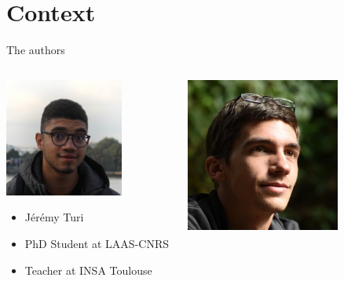 \section{Context}

\begin{frame}{The authors}
    \begin{columns}
        \begin{column}{0.5\textwidth}
            \includegraphics[width = 0.7\textwidth]{images/profile_picture/jeremy.jpeg}
            \begin{itemize}
                \item Jérémy Turi
                \item PhD Student at LAAS-CNRS
                \item Teacher at INSA Toulouse
            \end{itemize}
        \end{column}
        \begin{column}{0.5\textwidth}
            \includegraphics[width = 0.7\textwidth]{images/profile_picture/arthur.jpg}

\end{column}
\end{columns}
\end{frame}
